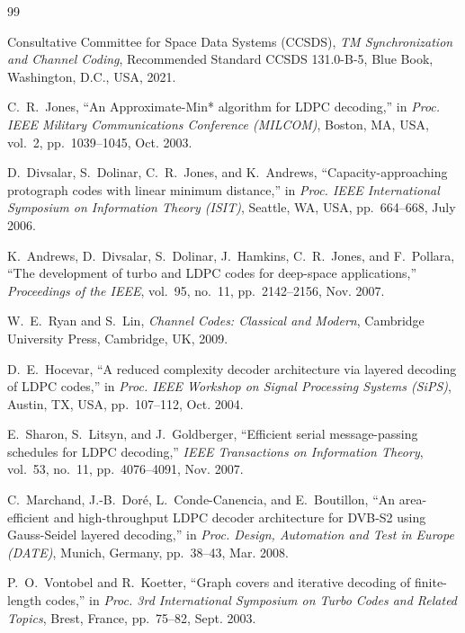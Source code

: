 \documentclass[10pt]{article}
\begin{document}
\begin{thebibliography}{99}
\small
\setlength{\itemsep}{2.5pt}
\setlength{\parskip}{0pt}

{Consultative Committee for Space Data Systems (CCSDS)}, \emph{TM Synchronization and Channel Coding}, Recommended Standard CCSDS 131.0-B-5, Blue Book, Washington, D.C., USA, 2021.

C.~R.~Jones, ``An Approximate-Min* algorithm for LDPC decoding,'' in \emph{Proc. IEEE Military Communications Conference (MILCOM)}, Boston, MA, USA, vol.~2, pp.~1039--1045, Oct. 2003.

D.~Divsalar, S.~Dolinar, C.~R.~Jones, and K.~Andrews, ``Capacity-approaching protograph codes with linear minimum distance,'' in \emph{Proc. IEEE International Symposium on Information Theory (ISIT)}, Seattle, WA, USA, pp.~664--668, July 2006.

K.~Andrews, D.~Divsalar, S.~Dolinar, J.~Hamkins, C.~R.~Jones, and F.~Pollara, ``The development of turbo and LDPC codes for deep-space applications,'' \emph{Proceedings of the IEEE}, vol.~95, no.~11, pp.~2142--2156, Nov. 2007.

W.~E.~Ryan and S.~Lin, \emph{Channel Codes: Classical and Modern}, Cambridge University Press, Cambridge, UK, 2009.

D.~E.~Hocevar, ``A reduced complexity decoder architecture via layered decoding of LDPC codes,'' in \emph{Proc. IEEE Workshop on Signal Processing Systems (SiPS)}, Austin, TX, USA, pp.~107--112, Oct. 2004.

E.~Sharon, S.~Litsyn, and J.~Goldberger, ``Efficient serial message-passing schedules for LDPC decoding,'' \emph{IEEE Transactions on Information Theory}, vol.~53, no.~11, pp.~4076--4091, Nov. 2007.

C.~Marchand, J.-B.~Dor{\'e}, L.~Conde-Canencia, and E.~Boutillon, ``An area-efficient and high-throughput LDPC decoder architecture for DVB-S2 using Gauss-Seidel layered decoding,'' in \emph{Proc. Design, Automation and Test in Europe (DATE)}, Munich, Germany, pp.~38--43, Mar. 2008.

P.~O.~Vontobel and R.~Koetter, ``Graph covers and iterative decoding of finite-length codes,'' in \emph{Proc. 3rd International Symposium on Turbo Codes and Related Topics}, Brest, France, pp.~75--82, Sept. 2003.


\end{thebibliography}
\end{document}
